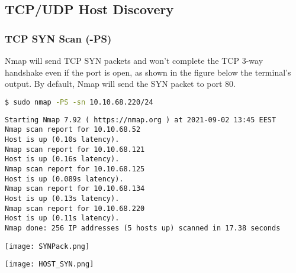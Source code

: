 \documentclass[11pt]{article}
\newenvironment{commandbox}[1][]{
    \begin{tcolorbox}[
        colback=kalibackground,
        colframe=commandcolor,
        fonttitle=\bfseries\color{white},
        title=#1,
        breakable=true
    ]
}{
    \end{tcolorbox}
}
\begin{document}
\setcounter{section}{2}
\setcounter{subsection}{2}
\setcounter{page}{10}  %

\renewcommand{\thesubsubsection}{\thesubsection.\Roman{subsubsection}}

\subsection{TCP/UDP Host Discovery}

\subsubsection{TCP SYN Scan (-PS)}

Nmap will send TCP SYN packets and won't complete the TCP 3-way handshake even if the port is open, as shown in the figure below the terminal's output. By default, Nmap will send the SYN packet to port 80.

\begin{commandbox}[TCP SYN Scan (-PS)]
\begin{lstlisting}[language=bash, style=bash, basicstyle=\small\ttfamily\color{warningcolor}]
$ sudo nmap -PS -sn 10.10.68.220/24
\end{lstlisting}

\begin{lstlisting}[basicstyle=\small\ttfamily\color{kalitext}]
Starting Nmap 7.92 ( https://nmap.org ) at 2021-09-02 13:45 EEST
Nmap scan report for 10.10.68.52
Host is up (0.10s latency).
Nmap scan report for 10.10.68.121
Host is up (0.16s latency).
Nmap scan report for 10.10.68.125
Host is up (0.089s latency).
Nmap scan report for 10.10.68.134
Host is up (0.13s latency).
Nmap scan report for 10.10.68.220
Host is up (0.11s latency).
Nmap done: 256 IP addresses (5 hosts up) scanned in 17.38 seconds
\end{lstlisting}
\end{commandbox}

\begin{center}
\texttt{[image: SYNPack.png]}
\end{center}
\begin{center}
    \texttt{[image: HOST\_SYN.png]}
    \end{center}
\end{document}
